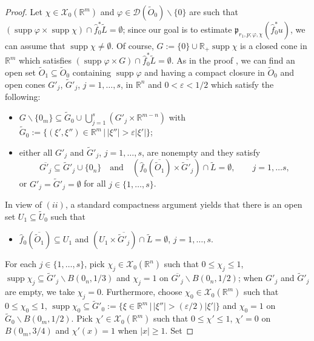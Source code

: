 \documentclass[12pt,reqno]{amsart}
\newcommand{\RR}{\mathbb R}
\newcommand{\DD}{\mathcal D}
\newcommand{\XX}{\mathcal X}
\newcommand{\supp}{\operatorname{supp}}
\theoremstyle{plain}
\theoremstyle{remark}
\theoremstyle{definition}
\numberwithin{equation}{section}
\begin{document}
\begin{proof}
Let $\chi\in\XX_0(\RR^m)$ and $\varphi\in\DD(\widetilde{O}_0)\backslash\{0\}$ are such that $(\supp\varphi\times\supp\chi)\cap \hat{f}_0^*\widetilde{L}=\emptyset$; since our goal is to estimate $\mathfrak{p}_{r_1,p;\varphi,\chi}(\hat{f}^*_0u)$, we can assume that $\supp\chi\neq\emptyset$. Of course, $G:=\{0\}\cup\RR_+\supp\chi$ is a closed cone in $\RR^m$ which satisfies $(\supp\varphi\times G)\cap \hat{f}_0^*\widetilde{L}=\emptyset$. As in the proof \cite[Theorem 3.21, CASE 3]{PP}, we can find an open set $\widetilde{O}_1\subseteq \widetilde{O}_0$ containing $\supp\varphi$ and having a compact closure in $\widetilde{O}_0$ and open cones $G'_j$, $\widetilde{G}'_j$, $j=1,\ldots,s$, in $\RR^n$ and $0<\varepsilon<1/2$ which satisfy the following:
\begin{itemize}
\item[$(i)$] $G\backslash\{0_m\}\subseteq \widetilde{G}_0\cup\bigcup_{j=1}^s(G'_j\times\RR^{m-n})$ with $\widetilde{G}_0:=\{(\xi',\xi'')\in\RR^m\,|\, |\xi''|> \varepsilon|\xi'|\}$;
\item[$(ii)$] either all $G'_j$ and $\widetilde{G}'_j$, $j=1,\ldots,s$, are nonempty and they satisfy
\begin{equation*}
\overline{G'_j}\subseteq \widetilde{G}'_j\cup\{0_n\}\quad \mbox{and}\quad (\hat{f}_0(\overline{\widetilde{O}_1})\times \overline{\widetilde{G}'_j})\cap \widetilde{L}=\emptyset,\qquad j=1,\ldots s,
\end{equation*}
or $G'_j=\widetilde{G}'_j=\emptyset$ for all $j\in\{1,\ldots,s\}$.
\end{itemize}
In view of $(ii)$, a standard compactness argument yields that there is an open set $U_1\subseteq \widetilde{U}_0$ such that
\begin{itemize}
\item[$(iii)$] $\hat{f}_0(\overline{\widetilde{O}_1})\subseteq U_1$ and $(U_1\times \overline{\widetilde{G}'_j})\cap \widetilde{L}=\emptyset$, $j=1,\ldots,s$.
\end{itemize}
For each $j\in\{1,\ldots,s\}$, pick $\chi_j\in\XX_0(\RR^n)$ such that $0\leq \chi_j\leq1$, $\supp\chi_j\subseteq \widetilde{G}'_j\backslash B(0_n,1/3)$ and $\chi_j=1$ on $\overline{G'_j}\backslash B(0_n,1/2)$; when $G'_j$ and $\widetilde{G}'_j$ are empty, we take $\chi_j=0$. Furthermore, choose $\chi_0\in\XX_0(\RR^m)$ such that $0\leq \chi_0\leq 1$, $\supp\chi_0\subseteq \widetilde{G}'_0:=\{\xi\in\RR^m\,|\, |\xi''|>(\varepsilon/2)|\xi'|\}$ and $\chi_0=1$ on $\widetilde{G}_0\backslash B(0_m,1/2)$. Pick $\chi'\in\XX_0(\RR^m)$ such that $0\leq \chi'\leq 1$, $\chi'=0$ on $B(0_m,3/4)$ and $\chi'(x)=1$ when $|x|\geq 1$. Set

\end{proof}
\end{document}
